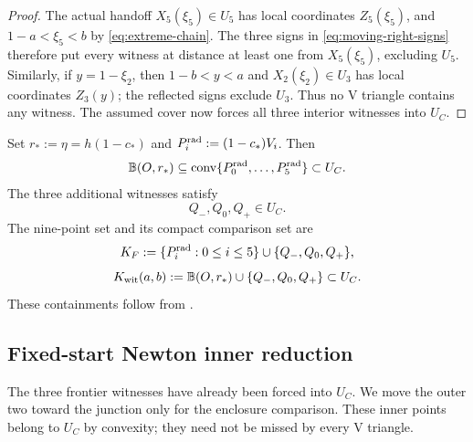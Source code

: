 \begin{proof}
The actual handoff $X_5(\xi_5)\in U_5$ has local coordinates
$Z_5(\xi_5)$, and
$1-a<\xi_5<b$ by \eqref{eq:extreme-chain}.  The three signs in
\eqref{eq:moving-right-signs} therefore put every witness at distance at
least one from $X_5(\xi_5)$, excluding $U_5$.  Similarly, if $y=1-\xi_2$, then
$1-b<y<a$ and $X_2(\xi_2)\in U_3$ has local coordinates $Z_3(y)$;
the reflected signs exclude $U_3$.
Thus no V triangle contains any witness.  The assumed cover now forces all
three interior witnesses into $U_C$.
\end{proof}

Set $r_*:=\eta=h(1-c_*)$ and $P_i^{\rm rad}:=(1-c_*)V_i$. Then
\begin{equation}
 \mathbb B(O,r_*)\subseteq\mathrm{conv}\{P_0^{\rm rad},\ldots,P_5^{\rm rad}\}
 \subset U_C.
 \label{eq:reader-forced-disk}
\end{equation}
The three additional witnesses satisfy
\begin{equation}
 Q_-,Q_0,Q_+\in U_C.
 \label{eq:reader-forced-asymmetric}
\end{equation}
The nine-point set and its compact comparison set are
\[
 K_F:=\{P_i^{\rm rad}:0\le i\le5\}\cup\{Q_-,Q_0,Q_+\},
\]
\begin{equation}
 K_{\rm wit}(a,b):=\mathbb B(O,r_*)\cup\{Q_-,Q_0,Q_+\}\subset U_C.
 \label{eq:reader-witness-set}
\end{equation}
These containments follow from .





\subsection{Fixed-start Newton inner reduction}

The three frontier witnesses have already been forced into $U_C$.
We move the outer two toward the junction only for the enclosure
comparison.  These inner points belong to $U_C$ by convexity; they need
not be missed by every V triangle.

